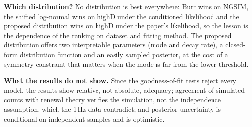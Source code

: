 \documentclass[10pt,a4paper]{article}
\numberwithin{equation}{section}
\begin{document}
\textbf{Which distribution?} No distribution is best everywhere: Burr wins on NGSIM, the shifted log-normal wins on highD under the conditioned likelihood and the proposed distribution wins on highD under the paper's likelihood, so the lesson is the dependence of the ranking on dataset and fitting method. The proposed distribution offers two interpretable parameters (mode and decay rate), a closed-form distribution function and an easily sampled posterior, at the cost of a symmetry constraint that matters when the mode is far from the lower threshold.

\textbf{What the results do not show.} Since the goodness-of-fit tests reject every model, the results show relative, not absolute, adequacy; agreement of simulated counts with renewal theory verifies the simulation, not the independence assumption, which the 1\,Hz data contradict; and posterior uncertainty is conditional on independent samples and is optimistic.

\end{document}
